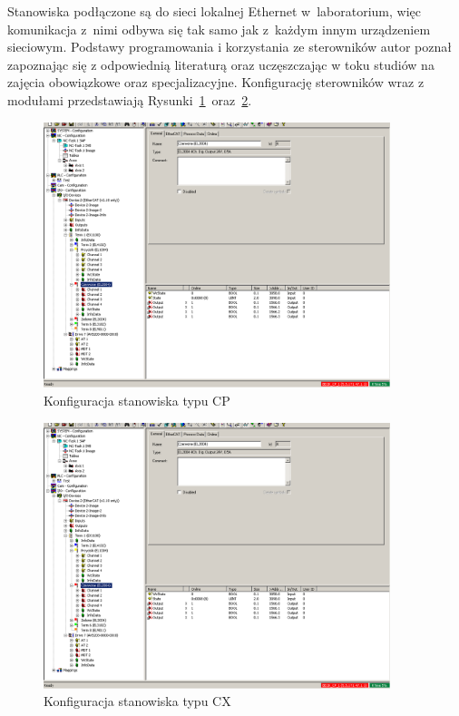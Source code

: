 \indent
\indent Stanowiska podłączone są do sieci lokalnej Ethernet w~laboratorium, więc komunikacja z~nimi odbywa się tak samo jak z~każdym innym urządzeniem sieciowym. Podstawy programowania i korzystania ze sterowników autor poznał zapoznając się z odpowiednią literaturą \cite{plc1,plc2,plc4,plc5,plc6} oraz uczęszczając w toku studiów na zajęcia obowiązkowe oraz specjalizacyjne.
Konfigurację sterowników wraz z modułami przedstawiają Rysunki~\ref{conf:cp}~oraz~\ref{conf:cx}.
\begin{figure}[!htb] 	\centering 	\includegraphics[width=0.9\textwidth]{images/confCP} \caption{Konfiguracja stanowiska typu CP} \label{conf:cp} \end{figure}
\begin{figure}[!htb] 	\centering 	\includegraphics[width=0.9\textwidth]{images/confCX} \caption{Konfiguracja stanowiska typu CX} \label{conf:cx} \end{figure}

